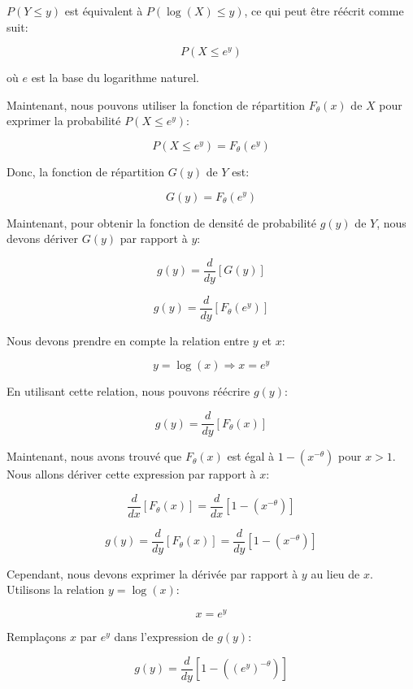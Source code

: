\documentclass[11pt]{beamer}
\begin{document}
\begin{frame}
	$P(Y \leq y)$ est équivalent à $P(\log(X) \leq y)$, ce qui peut être réécrit comme suit:
	
	\[ P(X \leq e^y) \]
	
	où $e$ est la base du logarithme naturel.
	
	Maintenant, nous pouvons utiliser la fonction de répartition $F_\theta(x)$ de $X$ pour exprimer la probabilité $P(X \leq e^y)$:
	
	\[ P(X \leq e^y) = F_\theta(e^y) \]
	
	Donc, la fonction de répartition $G(y)$ de $Y$ est:
	
	\[ G(y) = F_\theta(e^y) \]
	
	
\end{frame}
\begin{frame}
		Maintenant, pour obtenir la fonction de densité de probabilité $g(y)$ de $Y$, nous devons dériver $G(y)$ par rapport à $y$:
	
	\[ g(y) = \frac{d}{dy} [G(y)] \]
	
	\[ g(y) = \frac{d}{dy} [F_\theta(e^y)] \]
	
	Nous devons prendre en compte la relation entre $y$ et $x$:
	
	\[ y = \log(x) \Rightarrow x = e^y \]
	
	En utilisant cette relation, nous pouvons réécrire $g(y)$:
	
	\[ g(y) = \frac{d}{dy} [F_\theta(x)] \]
	
	
\end{frame}
\begin{frame}
	
	Maintenant, nous avons trouvé que $F_\theta(x)$ est égal à $1 - (x^{-\theta})$ pour $x > 1$. Nous allons dériver cette expression par rapport à $x$:
	
	\[ \frac{d}{dx} [F_\theta(x)] = \frac{d}{dx} [1 - (x^{-\theta})] \]
	
	\[ g(y) = \frac{d}{dy} [F_\theta(x)] = \frac{d}{dy} [1 - (x^{-\theta})] \]
	
	Cependant, nous devons exprimer la dérivée par rapport à $y$ au lieu de $x$. Utilisons la relation $y = \log(x)$:
	
	\[ x = e^y \]
	
	Remplaçons $x$ par $e^y$ dans l'expression de $g(y)$:
	
	\[ g(y) = \frac{d}{dy} [1 - ((e^y)^{-\theta})] \]

\end{frame}
\end{document}
